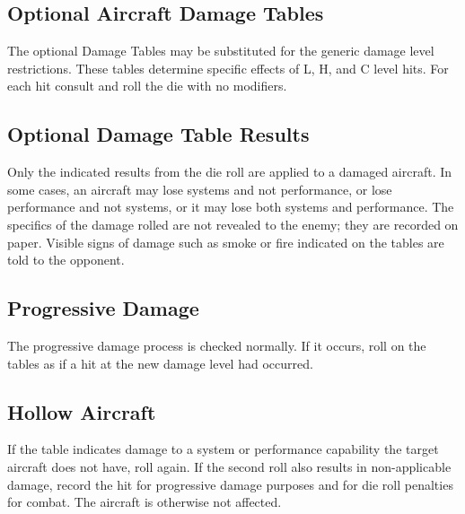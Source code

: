 \begin{advancedrules}
    \section{Optional Aircraft Damage Tables}


    The optional Damage Tables may be substituted for the generic damage level restrictions. These tables determine specific effects of L, H, and C level hits. For each hit consult  and roll the die with no modifiers.  

    \subsection{Optional Damage Table Results} Only the indicated results from the die roll are applied to a damaged aircraft. In some cases, an aircraft may lose systems and not performance, or lose performance and not systems, or it may lose both systems and performance. The specifics of the damage rolled are not revealed to the enemy; they are recorded on paper. Visible signs of damage such as smoke or fire indicated on the tables are told to the opponent.

    \subsection{Progressive Damage} The progressive damage process is checked normally. If it occurs, roll on the tables as if a hit at the new damage level had occurred.

    \subsection{Hollow Aircraft} If the table indicates damage to a system or performance capability the target aircraft does not have, roll again. If the second roll also results in non-applicable damage, record the hit for progressive damage purposes and for die roll penalties for combat. The aircraft is otherwise not affected.


\end{advancedrules}
